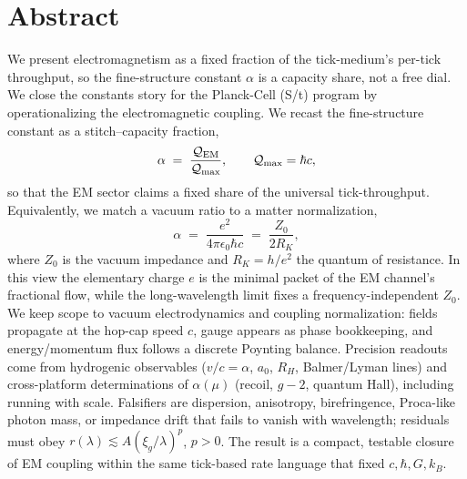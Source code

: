 \section*{Abstract}
We present electromagnetism as a fixed fraction of the tick-medium's per-tick throughput, so the fine-structure constant $\alpha$ is a capacity share, not a free dial.
We close the constants story for the Planck-Cell (S/t) program by
operationalizing the electromagnetic coupling. We recast the fine-structure
constant as a stitch–capacity fraction,
\[
\alpha \;=\; \frac{\mathcal Q_{\rm EM}}{\mathcal Q_{\max}},\qquad \mathcal Q_{\max}=\hbar c,
\]
so that the EM sector claims a fixed share of the universal tick-throughput.
Equivalently, we match a vacuum ratio to a matter normalization,
\[
\alpha \;=\; \frac{e^2}{4\pi\epsilon_0\hbar c} \;=\; \frac{Z_0}{2R_K},
\]
where \(Z_0\) is the vacuum impedance and \(R_K=h/e^2\) the quantum of
resistance. In this view the elementary charge \(e\) is the minimal packet of
the EM channel’s fractional flow, while the long-wavelength limit fixes a
frequency-independent \(Z_0\). We keep scope to vacuum electrodynamics and
coupling normalization: fields propagate at the hop-cap speed \(c\), gauge
appears as phase bookkeeping, and energy/momentum flux follows a discrete
Poynting balance. Precision readouts come from hydrogenic observables
(\(v/c=\alpha\), \(a_0\), \(R_H\), Balmer/Lyman lines) and cross-platform
determinations of \(\alpha(\mu)\) (recoil, \(g\!-\!2\), quantum Hall), including
running with scale. Falsifiers are dispersion, anisotropy, birefringence,
Proca-like photon mass, or impedance drift that fails to vanish with
wavelength; residuals must obey \(r(\lambda)\!\lesssim\!A(\xi_g/\lambda)^p\),
\(p>0\). The result is a compact, testable closure of EM coupling within the
same tick-based rate language that fixed \(c,\hbar,G,k_B\).
